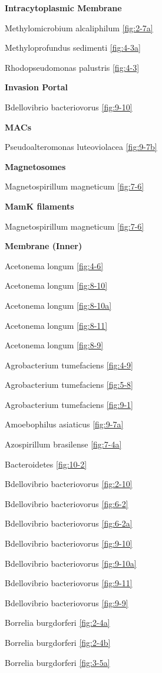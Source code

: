 \documentclass[]{tufte-book}
\begin{document}
\textbf{Intracytoplasmic Membrane}

Methylomicrobium alcaliphilum \ref{fig:2-7a}

Methyloprofundus sedimenti \ref{fig:4-3a}

Rhodopseudomonas palustris \ref{fig:4-3}

\textbf{Invasion Portal}

Bdellovibrio bacteriovorus \ref{fig:9-10}

\textbf{MACs}

Pseudoalteromonas luteoviolacea \ref{fig:9-7b}

\textbf{Magnetosomes}

Magnetospirillum magneticum \ref{fig:7-6}

\textbf{MamK filaments}

Magnetospirillum magneticum \ref{fig:7-6}

\textbf{Membrane (Inner)}

Acetonema longum \ref{fig:4-6}

Acetonema longum \ref{fig:8-10}

Acetonema longum \ref{fig:8-10a}

Acetonema longum \ref{fig:8-11}

Acetonema longum \ref{fig:8-9}

Agrobacterium tumefaciens \ref{fig:4-9}

Agrobacterium tumefaciens \ref{fig:5-8}

Agrobacterium tumefaciens \ref{fig:9-1}

Amoebophilus asiaticus \ref{fig:9-7a}

Azospirillum brasilense \ref{fig:7-4a}

Bacteroidetes \ref{fig:10-2}

Bdellovibrio bacteriovorus \ref{fig:2-10}

Bdellovibrio bacteriovorus \ref{fig:6-2}

Bdellovibrio bacteriovorus \ref{fig:6-2a}

Bdellovibrio bacteriovorus \ref{fig:9-10}

Bdellovibrio bacteriovorus \ref{fig:9-10a}

Bdellovibrio bacteriovorus \ref{fig:9-11}

Bdellovibrio bacteriovorus \ref{fig:9-9}

Borrelia burgdorferi \ref{fig:2-4a}

Borrelia burgdorferi \ref{fig:2-4b}

Borrelia burgdorferi \ref{fig:3-5a}
\end{document}
